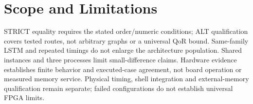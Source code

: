 \section{Scope and Limitations}
STRICT equality requires the stated order/numeric conditions; ALT qualification covers tested routes, not arbitrary graphs or a universal QoR bound. Same-family LSTM and repeated timings do not enlarge the architecture population. Shared instances and three processes limit small-difference claims. Hardware evidence establishes finite behavior and executed-case agreement, not board operation or measured memory service. Physical timing, shell integration and external-memory qualification remain separate; failed configurations do not establish universal FPGA limits.
